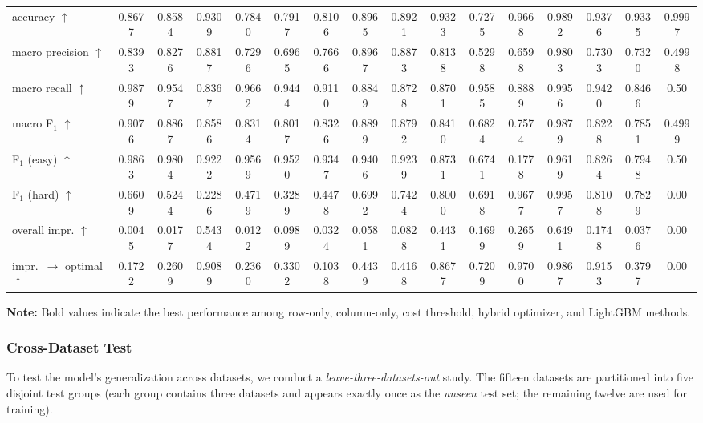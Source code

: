 \documentclass[sigconf, nonacm]{acmart}
\begin{document}
\begin{table*}[!h]
{\begin{tabular}{l *{15}{S[table-format=1.4]}}
%
    accuracy $\uparrow$                & 0.8677 & 0.8584 & 0.9309 & 0.7840 & 0.7917 & 0.8106 & 0.8965 & 0.8921 & 0.9323 & 0.7275 & 0.9668 & 0.9892 & 0.9376 & 0.9335 & 0.9997 \\
    macro precision $\uparrow$         & 0.8393 & 0.8276 & 0.8817 & 0.7296 & 0.6965 & 0.7666 & 0.8967 & 0.8873 & 0.8138 & 0.5298 & 0.6598 & 0.9803 & 0.7303 & 0.7320 & 0.4998 \\
    macro recall $\uparrow$            & 0.9879 & 0.9547 & 0.8367 & 0.9662 & 0.9444 & 0.9110 & 0.8849 & 0.8728 & 0.8701 & 0.9585 & 0.8889 & 0.9956 & 0.9420 & 0.8466 & 0.50 \\
    macro F$_1$ $\uparrow$             & 0.9076 & 0.8867 & 0.8586 & 0.8314 & 0.8017 & 0.8326 & 0.8899 & 0.8792 & 0.8410 & 0.6824 & 0.7574 & 0.9879 & 0.8228 & 0.7851 & 0.4999 \\ \addlinespace
%
    F$_1$ (easy) $\uparrow$            & 0.9863 & 0.9804 & 0.9222 & 0.9569 & 0.9520 & 0.9347 & 0.9406 & 0.9239 & 0.8731 & 0.6741 & 0.1778 & 0.9619 & 0.8264 & 0.7948 & 0.50 \\
    F$_1$ (hard) $\uparrow$            & 0.6609 & 0.5244 & 0.2286 & 0.4719 & 0.3289 & 0.4478 & 0.6992 & 0.7424 & 0.8000 & 0.6918 & 0.9677 & 0.9957 & 0.8108 & 0.7829 & 0.00 \\ \addlinespace \midrule
%
    overall impr. $\uparrow$           & 0.0045 & 0.0177 & 0.5434 & 0.0122 & 0.0989 & 0.0324 & 0.0581 & 0.0828 & 0.4431 & 0.1699 & 0.2659 & 0.6491 & 0.1748 & 0.0376 & 0.00 \\
    impr.\ $\to$ optimal $\uparrow$    & 0.1722 & 0.2609 & 0.9089 & 0.2360 & 0.3302 & 0.1038 & 0.4439 & 0.4168 & 0.8677 & 0.7209 & 0.9700 & 0.9867 & 0.9153 & 0.3797 & 0.00 \\
    \bottomrule
  \end{tabular}}
  \vspace{0.2em}
  \footnotesize{\textbf{Note:} Bold values indicate the best performance among row-only, column-only, cost threshold, hybrid optimizer, and LightGBM methods.}
\end{table*}



\subsubsection{Cross-Dataset Test}
\label{sssec:cross_dataset}

To test the model's generalization across datasets, we conduct a
\emph{leave-three-datasets-out} study.
The fifteen datasets are partitioned into five disjoint test groups  
(each group contains three datasets and appears exactly once as the
\emph{unseen} test set; the remaining twelve are used for training).
\end{document}
